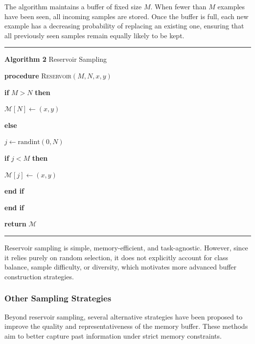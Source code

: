 The algorithm maintains a buffer of fixed size $M$. When fewer than $M$ examples have
been seen, all incoming samples are stored. Once the buffer is full, each new example
has a decreasing probability of replacing an existing one, ensuring that all previously
seen samples remain equally likely to be kept.


\noindent\rule{\textwidth}{0.8pt}

\noindent\textbf{Algorithm 2} Reservoir Sampling

\noindent\textbf{procedure} \textsc{Reservoir}$(M, N, x, y)$

\noindent\hspace{0.6cm}\textbf{if} $M > N$ \textbf{then}

\noindent\hspace{1.2cm}$\mathcal{M}[N] \leftarrow (x, y)$

\noindent\hspace{0.6cm}\textbf{else}

\noindent\hspace{1.2cm}$j \leftarrow \text{randint}(0, N)$

\noindent\hspace{1.2cm}\textbf{if} $j < M$ \textbf{then}

\noindent\hspace{1.8cm}$\mathcal{M}[j] \leftarrow (x, y)$

\noindent\hspace{1.2cm}\textbf{end if}

\noindent\hspace{0.6cm}\textbf{end if}

\noindent\textbf{return} $\mathcal{M}$

\noindent\rule{\textwidth}{0.8pt}


Reservoir sampling is simple, memory-efficient, and task-agnostic. However, since it
relies purely on random selection, it does not explicitly account for class balance,
sample difficulty, or diversity, which motivates more advanced buffer construction
strategies.

\subsubsection{Other Sampling Strategies}

Beyond reservoir sampling, several alternative strategies have been proposed to improve
the quality and representativeness of the memory buffer. These methods aim to better
capture past information under strict memory constraints.

